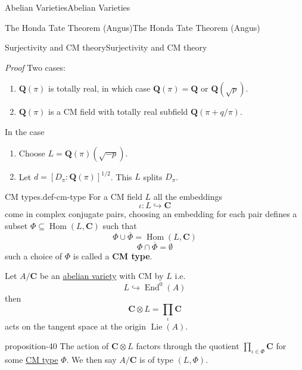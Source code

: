 \documentclass[10pt,]{book}
\makeatletter
\newcommand{\terminology}[1]{\textbf{#1}}
\renewcommand*{\proofname}{Proof}
\renewenvironment{proof}[1][\proofname]{\par
  \pushQED{\qed}%
  \normalfont \topsep6\p@\@plus6\p@\relax
  \trivlist
  \item\relax
    {\itshape
    #1\@addpunct{.}}\hspace\labelsep\ignorespaces
}{%
  \popQED\endtrivlist\@endpefalse
}
\numberwithin{equation}{section}
\newcommand{\Lie}{\operatorname{Lie}}
\newcommand{\lb}{[}
\newcommand{\rb}{]}
\newcommand{\QQ}{\mathbf{Q}}
\newcommand{\CC}{\mathbf{C}}
\DeclareMathOperator{\End}{End}
\DeclareMathOperator{\Hom}{Hom}
\makeatother
\begin{document}
\begin{chapterptx}{Abelian Varieties}{}{Abelian Varieties}{}{}
\begin{sectionptx}{The Honda Tate Theorem (Angus)}{}{The Honda Tate Theorem (Angus)}{}{}
\begin{subsectionptx}{Surjectivity and CM theory}{}{Surjectivity and CM theory}{}{}
\begin{proof}\hypertarget{proof-75}{}
\hypertarget{p-440}{}%
Two cases:\leavevmode%
\begin{enumerate}
\item\hypertarget{li-94}{}\(\QQ(\pi)\) is totally real, in which case \(\QQ(\pi) = \QQ\) or \(\QQ(\sqrt{p})\).%
\item\hypertarget{li-95}{}\(\QQ(\pi)\) is a CM field with totally real subfield \(\QQ(\pi + q/\pi)\).%
\end{enumerate}
In the case\leavevmode%
\begin{enumerate}
\item\hypertarget{li-96}{}Choose \(L = \QQ(\pi)(\sqrt{-p})\).%
\item\hypertarget{li-97}{}Let \(d= \lb D_\pi: \QQ(\pi)\rb^{1/2}\). This \(L\) splits \(D_\pi\).%
\end{enumerate}
%
\end{proof}
\begin{definition}{CM types.}{def-cm-type}%
\hypertarget{p-441}{}%
For a CM field \(L\) all the embeddings%
\begin{equation*}
\iota\colon L \hookrightarrow \CC
\end{equation*}
come in complex conjugate pairs, choosing an embedding for each pair defines a subset \(\Phi\subseteq \Hom(L, \CC)\) such that%
\begin{equation*}
\Phi \cup \overline \Phi = \Hom(L,\CC)
\end{equation*}
%
\begin{equation*}
\Phi \cap \overline \Phi = \emptyset
\end{equation*}
such a choice of \(\Phi \) is called a \terminology{CM type}.%
\end{definition}
\hypertarget{p-442}{}%
Let \(A/\CC\) be an \hyperref[def-buntes-abvar]{abelian variety} with CM by \(L\) i.e.%
\begin{equation*}
L\hookrightarrow \End^0(A)
\end{equation*}
then%
\begin{equation*}
\CC\otimes L = \prod_\iota \CC
\end{equation*}
acts on the tangent space at the origin \(\Lie(A)\).%
\begin{proposition}{}{}{proposition-40}%
\hypertarget{p-443}{}%
The action of \(\CC\otimes L\) factors through the quotient \(\prod_{\iota\in \Phi} \CC\) for some \hyperref[def-cm-type]{CM type} \(\Phi\). We then say \(A/\CC\) is of type \((L,\Phi)\).%
\end{proposition}

\end{subsectionptx}
\end{sectionptx}
\end{chapterptx}
\end{document}
